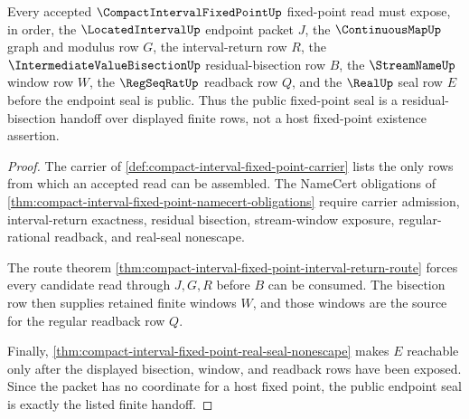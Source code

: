 \begin{theorem}
\label{thm:compact-interval-fixed-point-residual-bisection-handoff}
Every accepted $\CompactIntervalFixedPointUp$ fixed-point read must expose, in order, the $\LocatedIntervalUp$ endpoint packet $J$, the $\ContinuousMapUp$ graph and modulus row $G$, the interval-return row $R$, the $\IntermediateValueBisectionUp$ residual-bisection row $B$, the $\StreamNameUp$ window row $W$, the $\RegSeqRatUp$ readback row $Q$, and the $\RealUp$ seal row $E$ before the endpoint seal is public. Thus the public fixed-point seal is a residual-bisection handoff over displayed finite rows, not a host fixed-point existence assertion.
\end{theorem}
\begin{proof}
The carrier of \autoref{def:compact-interval-fixed-point-carrier} lists the only rows from which an accepted read can be assembled. The NameCert obligations of \autoref{thm:compact-interval-fixed-point-namecert-obligations} require carrier admission, interval-return exactness, residual bisection, stream-window exposure, regular-rational readback, and real-seal nonescape.

The route theorem \autoref{thm:compact-interval-fixed-point-interval-return-route} forces every candidate read through $J,G,R$ before $B$ can be consumed. The bisection row then supplies retained finite windows $W$, and those windows are the source for the regular readback row $Q$.

Finally, \autoref{thm:compact-interval-fixed-point-real-seal-nonescape} makes $E$ reachable only after the displayed bisection, window, and readback rows have been exposed. Since the packet has no coordinate for a host fixed point, the public endpoint seal is exactly the listed finite handoff.
\end{proof}

